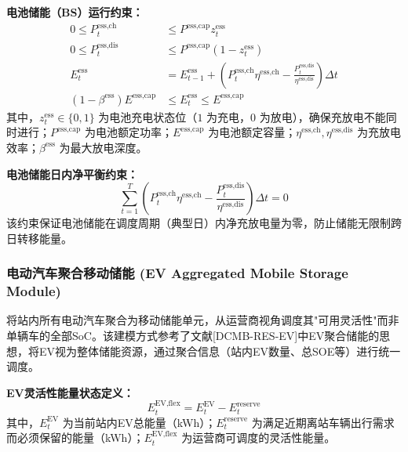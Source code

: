 \documentclass[11pt]{ctexart}
\begin{document}
\textbf{电池储能（BS）运行约束：}
\begin{align}
0 \le P_{t}^{\text{ess,ch}} & \le P^{\text{ess,cap}} z_{t}^{\text{ess}} \\
0 \le P_{t}^{\text{ess,dis}} & \le P^{\text{ess,cap}} (1 - z_{t}^{\text{ess}}) \\
E_{t}^{\text{ess}} & = E_{t-1}^{\text{ess}} + \left( P_{t}^{\text{ess,ch}} \eta^{\text{ess,ch}} - \frac{P_{t}^{\text{ess,dis}}}{\eta^{\text{ess,dis}}} \right) \Delta t \\
(1 - \beta^{\text{ess}}) E^{\text{ess,cap}} & \le E_{t}^{\text{ess}} \le E^{\text{ess,cap}}
\end{align}
其中，$z_{t}^{\text{ess}} \in \{0, 1\}$ 为电池充电状态位（$1$ 为充电，$0$ 为放电），确保充放电不能同时进行；$P^{\text{ess,cap}}$ 为电池额定功率；$E^{\text{ess,cap}}$ 为电池额定容量；$\eta^{\text{ess,ch}}, \eta^{\text{ess,dis}}$ 为充放电效率；$\beta^{\text{ess}}$ 为最大放电深度。

\textbf{电池储能日内净平衡约束：}
\begin{equation}
\sum_{t=1}^{T} \left( P_{t}^{\text{ess,ch}} \eta^{\text{ess,ch}} - \frac{P_{t}^{\text{ess,dis}}}{\eta^{\text{ess,dis}}} \right) \Delta t = 0
\end{equation}
该约束保证电池储能在调度周期（典型日）内净充放电量为零，防止储能无限制跨日转移能量。

\subsubsection{电动汽车聚合移动储能 (EV Aggregated Mobile Storage Module)}

将站内所有电动汽车聚合为移动储能单元，从运营商视角调度其"可用灵活性"而非单辆车的全部SoC。该建模方式参考了文献{[DCMB-RES-EV]}中EV聚合储能的思想，将EV视为整体储能资源，通过聚合信息（站内EV数量、总SOE等）进行统一调度。

\textbf{EV灵活性能量状态定义：}
\begin{equation}
E_{t}^{\text{EV,flex}} = E_{t}^{\text{EV}} - E_{t}^{\text{reserve}}
\end{equation}
其中，$E_{t}^{\text{EV}}$ 为当前站内EV总能量（kWh）；$E_{t}^{\text{reserve}}$ 为满足近期离站车辆出行需求而必须保留的能量（kWh）；$E_{t}^{\text{EV,flex}}$ 为运营商可调度的灵活性能量。
\end{document}

